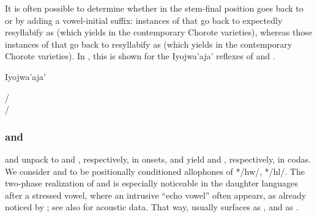 \begin{exe}
    \ex \food
    \ex \honeycomb
    \ex \goaway
    \ex \mortar
    \ex \hidev
    \ex \palm
    \ex \thread
    \ex \yicalhuk
    \ex \powder
    \ex \feces
    \ex \zorzal
    \ex \wildmanioc
    \ex \rope
    \ex \fence
    \ex \belt
    \ex \cat
    \ex \river
    \ex \plate
    \ex \blind
    \ex \unclesg
    \ex \chaja
    \ex \duraznillo
    \ex \leniosasg
    \ex \badmood
    \ex \allrcpr
    \ex \headn
    \ex \straw
    \ex \palosanto
    \ex \firewoodhuk
    \ex \cord
\end{exe}

It is often possible to determine whether  in the stem-final position goes back to  or  by adding a vowel-initial suffix: instances of  that go back to  expectedly resyllabify as  (which yields  in the contemporary Chorote varieties), whereas those instances of  that go back to  resyllabify as  (which yields  in the contemporary Chorote varieties). In , this is shown for the Iyojwa'aja' reflexes of  and .

\ea\label{ex:k-kj-alt:ch}
Iyojwa'aja'
    \begin{xlist}
        \ex {} / \\
        \ex {} / 
    \end{xlist}
\z
{}

\subsubsection{ and }\label{ch-f}

 and  unpack to  and , respectively, in onsets, and yield  and , respectively, in codas. We consider  and  to be positionally conditioned allophones of */hw/, */hl/. The two-phase realization of  and  is especially noticeable in the daughter languages after a stressed vowel, where an intrusive ``echo vowel'' often appears, as already noticed by \citet[24–26]{AG83}; see also \citet[80]{JC14b} for acoustic data. That way,  usually surfaces as , and  as .

